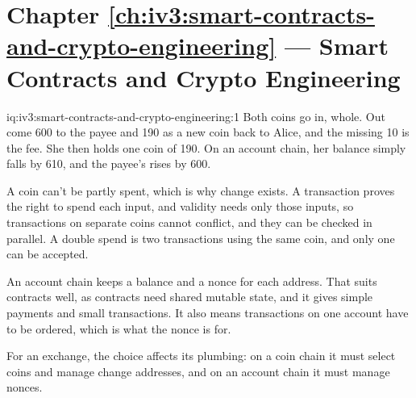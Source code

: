 \section*{Chapter \ref{ch:iv3:smart-contracts-and-crypto-engineering} --- Smart Contracts and Crypto Engineering}

\begin{solution}{iq:iv3:smart-contracts-and-crypto-engineering:1}
Both coins go in, whole. Out come 600 to the payee and 190 as a new coin back to Alice, and the missing 10 is the fee. She then holds one coin of 190. On an account chain, her balance simply falls by 610, and the payee's rises by 600.
\enlargethispage{-3\baselineskip}%
\label{lst:iv3:cr:utxo}

A coin can't be partly spent, which is why change exists. A transaction proves the right to spend each input, and validity needs only those inputs, so transactions on separate coins cannot conflict, and they can be checked in parallel. A double spend is two transactions using the same coin, and only one can be accepted.

An account chain keeps a balance and a nonce for each address. That suits contracts well, as contracts need shared mutable state, and it gives simple payments and small transactions. It also means transactions on one account have to be ordered, which is what the nonce is for.

For an exchange, the choice affects its plumbing: on a coin chain it must select coins and manage change addresses, and on an account chain it must manage nonces.

\end{solution}

